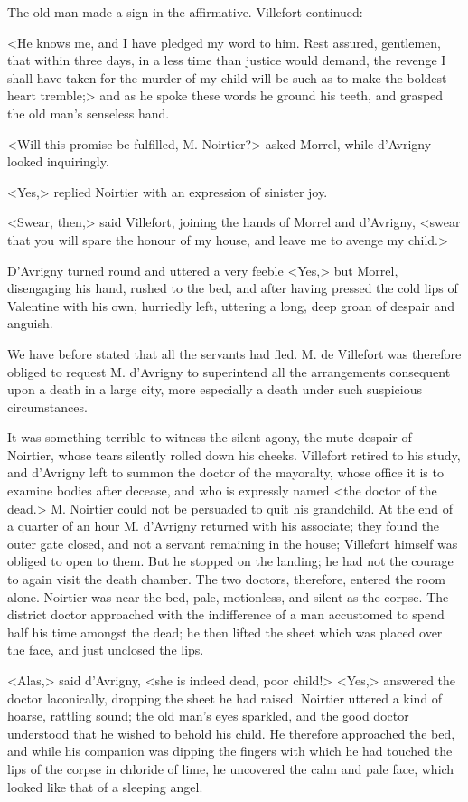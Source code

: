  The old man made a sign in the affirmative. Villefort continued: 

 <He knows me, and I have pledged my word to him. Rest assured, gentlemen, that within three days, in a less time than justice would demand, the revenge I shall have taken for the murder of my child will be such as to make the boldest heart tremble;> and as he spoke these words he ground his teeth, and grasped the old man's senseless hand. 

 <Will this promise be fulfilled, M. Noirtier?> asked Morrel, while d'Avrigny looked inquiringly. 

 <Yes,> replied Noirtier with an expression of sinister joy. 

 <Swear, then,> said Villefort, joining the hands of Morrel and d'Avrigny, <swear that you will spare the honour of my house, and leave me to avenge my child.> 

 D'Avrigny turned round and uttered a very feeble <Yes,> but Morrel, disengaging his hand, rushed to the bed, and after having pressed the cold lips of Valentine with his own, hurriedly left, uttering a long, deep groan of despair and anguish. 

 We have before stated that all the servants had fled. M. de Villefort was therefore obliged to request M. d'Avrigny to superintend all the arrangements consequent upon a death in a large city, more especially a death under such suspicious circumstances. 

 It was something terrible to witness the silent agony, the mute despair of Noirtier, whose tears silently rolled down his cheeks. Villefort retired to his study, and d'Avrigny left to summon the doctor of the mayoralty, whose office it is to examine bodies after decease, and who is expressly named <the doctor of the dead.> M. Noirtier could not be persuaded to quit his grandchild. At the end of a quarter of an hour M. d'Avrigny returned with his associate; they found the outer gate closed, and not a servant remaining in the house; Villefort himself was obliged to open to them. But he stopped on the landing; he had not the courage to again visit the death chamber. The two doctors, therefore, entered the room alone. Noirtier was near the bed, pale, motionless, and silent as the corpse. The district doctor approached with the indifference of a man accustomed to spend half his time amongst the dead; he then lifted the sheet which was placed over the face, and just unclosed the lips. 

 <Alas,> said d'Avrigny, <she is indeed dead, poor child!>  <Yes,> answered the doctor laconically, dropping the sheet he had raised. Noirtier uttered a kind of hoarse, rattling sound; the old man's eyes sparkled, and the good doctor understood that he wished to behold his child. He therefore approached the bed, and while his companion was dipping the fingers with which he had touched the lips of the corpse in chloride of lime, he uncovered the calm and pale face, which looked like that of a sleeping angel. 

